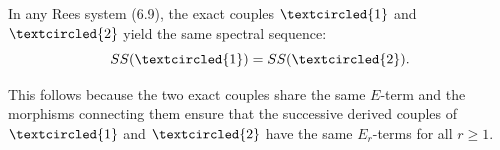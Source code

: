 In any Rees system (6.9), the exact couples $\textcircled{1}$ and $\textcircled{2}$ yield the same spectral sequence:
$$SS(\textcircled{1}) = SS(\textcircled{2}).$$

This follows because the two exact couples share the same $E$-term and the morphisms connecting them ensure that the successive derived couples of $\textcircled{1}$ and $\textcircled{2}$ have the same $E_r$-terms for all $r \geq 1$.
